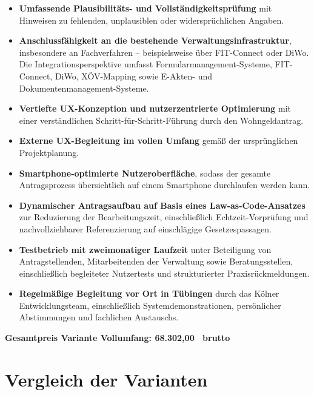 \begin{itemize}
  \item \textbf{Umfassende Plausibilitäts- und Vollständigkeitsprüfung} mit Hinweisen zu fehlenden, unplausiblen oder widersprüchlichen Angaben.
  \item \textbf{Anschlussfähigkeit an die bestehende Verwaltungsinfrastruktur}, insbesondere an Fachverfahren -- beispielsweise über FIT-Connect oder DiWo. Die Integrationsperspektive umfasst Formularmanagement-Systeme, FIT-Connect, DiWo, XÖV-Mapping sowie E-Akten- und Dokumentenmanagement-Systeme.
  \item \textbf{Vertiefte UX-Konzeption und nutzerzentrierte Optimierung} mit einer verständlichen Schritt-für-Schritt-Führung durch den Wohngeldantrag.
  \item \textbf{Externe UX-Begleitung im vollen Umfang} gemäß der ursprünglichen Projektplanung.
  \item \textbf{Smartphone-optimierte Nutzeroberfläche}, sodass der gesamte Antragsprozess übersichtlich auf einem Smartphone durchlaufen werden kann.
  \item \textbf{Dynamischer Antragsaufbau auf Basis eines Law-as-Code-Ansatzes} zur Reduzierung der Bearbeitungszeit, einschließlich Echtzeit-Vorprüfung und nachvollziehbarer Referenzierung auf einschlägige Gesetzespassagen.
  \item \textbf{Testbetrieb mit zweimonatiger Laufzeit} unter Beteiligung von Antragstellenden, Mitarbeitenden der Verwaltung sowie Beratungsstellen, einschließlich begleiteter Nutzertests und strukturierter Praxisrückmeldungen.
  \item \textbf{Regelmäßige Begleitung vor Ort in Tübingen} durch das Kölner Entwicklungsteam, einschließlich Systemdemonstrationen, persönlicher Abstimmungen und fachlichen Austauschs.
\end{itemize}

\medskip
\noindent\textbf{Gesamtpreis Variante Vollumfang: 68.302{,}00~\texteuro{} brutto}

\section{Vergleich der Varianten}

